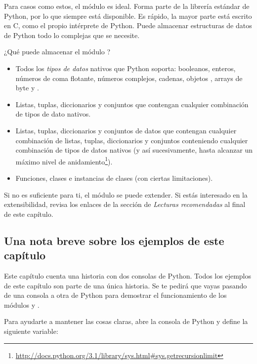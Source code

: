 Para casos como estos, el módulo  es ideal. Forma parte de la librería estándar de Python, por lo que siempre está disponible. Es rápido, la mayor parte está escrito en C, como el propio intérprete de Python. Puede almacenar estructuras de datos de Python todo lo complejas que se necesite.

¿Qué puede almacenar el módulo ?

\begin{itemize}

\item Todos los \emph{tipos de datos} nativos que Python soporta: booleanos, enteros, números de coma flotante, números complejos, cadenas, objetos , arrays de byte y .

\item Listas, tuplas, diccionarios y conjuntos que contengan cualquier combinación de tipos de dato nativos.

\item Listas, tuplas, diccionarios y conjuntos de datos que contengan cualquier combinación de listas, tuplas, diccionarios y conjuntos conteniendo cualquier combinación de tipos de datos nativos (y así sucesivamente, hasta alcanzar un máximo nivel de anidamiento\footnote{\href{http://docs.python.org/3.1/library/sys.html\#sys.getrecursionlimit}{http://docs.python.org/3.1/library/sys.html\#sys.getrecursionlimit}}).

\item Funciones, clases e instancias de clases (con ciertas limitaciones).

\end{itemize}

Si no es suficiente para ti, el módulo  se puede extender. Si estás interesado en la extensibilidad, revisa los enlaces de la sección de \emph{Lecturas recomendadas} al final de este capítulo.

\subsection{Una nota breve sobre los ejemplos de este capítulo}

Este capítulo cuenta una historia con dos consolas de Python. Todos los ejemplos de este capítulo son parte de una única historia. Se te pedirá que vayas pasando de una consola a otra de Python para demostrar el funcionamiento de los módulos  y .

Para ayudarte a mantener las cosas claras, abre la consola de Python y define la siguiente variable:

